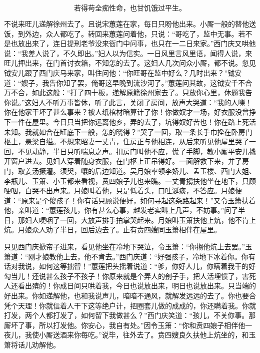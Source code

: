 \[
若得苟全痴性命，也甘饥饿过平生。
\]

不说来旺儿递解徐州去了。且说宋蕙莲在家，每日只盼他出来。小厮一般的替他送饭，到外边，众人都吃了。转回来蕙莲问着他，只说：“哥吃了，监中无事。若不是也放出来了，连日提刑老爷没来衙门中问事，也只在一二日来家。”西门庆又哄他说：“我差人说了，不久即出。”妇人以为信实。一日风里言风里语，闻得人说，来旺儿押出来，在门首讨衣箱，不知怎的去了。这妇人几次问众小厮，都不说。忽见钺安儿跟了西门庆马来家，叫住问他：“你旺哥在监中好么？几时出来？”钺安道：“嫂子，我告你知了罢，俺哥这早晚到流沙河了。”蕙莲问其故，这钺安千不合万不合，如此这般：“打了四十板，递解原籍徐州家去了。只放你心里，休题我告你说。”这妇人不听万事皆休，听了此言，关闭了房间，放声大哭道：“我的人嚛！你在他家干坏了甚么事来？被人纸棺材暗算计了你！你做奴才一场，好衣服没曾挣下一件在屋里。今日只当把你远离他乡，弄的去了，坑得奴好苦也！你在路上死活未知。我就如合在缸底下一般，怎的晓得？”哭了一回，取一条长手巾拴在卧房门枢上，悬梁自缢。不想来昭妻一丈青，住房正与他相连，从后来听见他屋里哭了一回，不见动静，半日只听喘息之声。扣房门叫他不应，慌了手脚，教小厮平安儿撬开窗户进去。见妇人穿着随身衣服，在门枢上正吊得好。一面解救下来，并了房门，取姜汤撅灌。须臾，嚷的后边知道。吴月娘率领李娇儿、孟玉楼、西门大姐、李瓶儿、玉箫、小玉都来看视，贲四娘子儿也来瞧。一丈青搊扶他坐在地下，只顾哽咽，白哭不出声来。月娘叫着他，只是低着头，口吐涎痰，不答应。月娘便道：“原来是个傻孩子！你有话只顾说便好，如何寻起这条路起来！”又令玉箫扶着他，亲叫道：“蕙莲孩儿，你有甚么心事，越发老实叫上几声，不妨事。”问了半日，那妇人哽咽了一回，大放声排手拍掌哭起来。月娘叫玉箫扶他上炕，他不肯上炕。月娘众人劝了半日，回后边去了。止有贲四嫂同玉箫相伴在屋里。

只见西门庆掀帘子进来，看见他坐在冷地下哭泣，令玉箫：“你搊他炕上去罢。”玉箫道：“刚才娘教他上去，他不肯去。”西门庆道：“好强孩子，冷地下冰着你。你有话对我说，如何这等拙智！”蕙莲把头摇着说道：“爹，你好人儿，你瞒着我干的好勾当儿！还说甚么孩子不孩子！你原来就是个弄人的刽子手，把人活埋惯了，害死人还看出殡的！你成日间只哄着我，今日也说放出来，明日也说放出来。只当端的好出来。你如递解他，也和我说声儿，暗暗不通风，就解发远远的去了。你也要合凭个天理！你就信着人干下这等绝户计，把圈套儿做的成成的，你还瞒着我。你就打发，两个人都打发了，如何留下我做甚么？”西门庆笑道：“孩儿，不关你事。那厮坏了事，所以打发他。你安心，我自有处。”因令玉箫：“你和贲四娘子相伴他一夜儿，我使小厮送酒来你每吃。”说毕，往外去了。贲四嫂良久扶他上炕坐的，和玉箫将话儿劝解他。

